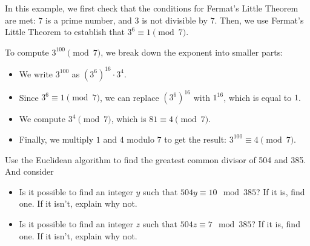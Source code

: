            In this example, we first check that the conditions for Fermat's Little Theorem are met: $7$ is a prime number, and $3$ is not divisible by $7$. Then, we use Fermat's Little Theorem to establish that $3^6 \equiv 1 \pmod{7}$.
            
            To compute $3^{100} \pmod{7}$, we break down the exponent into smaller parts:
            \begin{itemize}
            \item We write $3^{100}$ as $(3^6)^{16} \cdot 3^4$.
            \item Since $3^6 \equiv 1 \pmod{7}$, we can replace $(3^6)^{16}$ with $1^{16}$, which is equal to $1$.
            \item We compute $3^4 \pmod{7}$, which is $81 \equiv 4 \pmod{7}$.
            \item Finally, we multiply $1$ and $4$ modulo $7$ to get the result: $3^{100} \equiv 4 \pmod{7}$.
            \end{itemize}

\begin{exercise}
	Use the Euclidean algorithm to find the greatest common divisor of 504 and 385.
	And consider
	\begin{itemize}
		\item Is it possible to find an integer \(y\) such that \(504y \equiv 10 \mod 385\)? If it is, find one. If it isn't, explain why not.
		\item Is it possible to find an integer \(z\) such that \(504z \equiv 7 \mod 385\)? If it is, find one. If it isn't, explain why not.
	\end{itemize}
\end{exercise}


